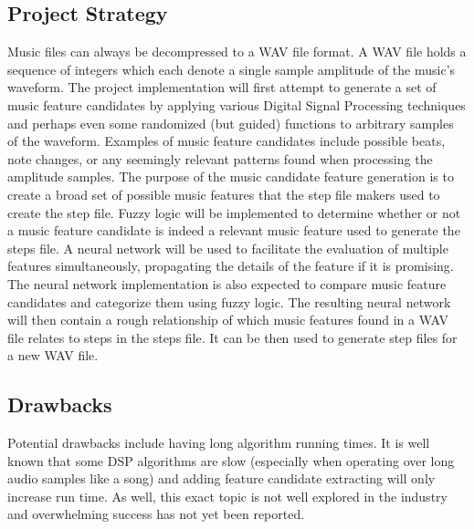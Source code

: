\subsection{Project Strategy}
Music files can always be decompressed to a WAV file format. A WAV file holds a sequence of
integers which each denote a single sample amplitude of the music’s waveform. The project
implementation will first attempt to generate a set of music feature candidates by applying 
various Digital Signal Processing techniques and perhaps even some randomized (but guided)
functions to arbitrary samples of the waveform. Examples of music feature candidates include
possible beats, note changes, or any seemingly relevant patterns found when processing the
amplitude samples. The purpose of the music candidate feature generation is to create a broad set
of possible music features that the step file makers used to create the step file. Fuzzy logic will
be implemented to determine whether or not a music feature candidate is indeed a relevant music
feature used to generate the steps file. A neural network will be used to facilitate the evaluation
of multiple features simultaneously, propagating the details of the feature if it is promising. The
neural network implementation is also expected to compare music feature candidates and
categorize them using fuzzy logic. The resulting neural network will then contain a rough
relationship of which music features found in a WAV file relates to steps in the steps file. It can
be then used to generate step files for a new WAV file.

\subsection{Drawbacks}

Potential drawbacks include having long algorithm running times. It is well known that some
DSP algorithms are slow (especially when operating over long audio samples like a song) and
adding feature candidate extracting will only increase run time. As well, this exact topic is not
well explored in the industry and overwhelming success has not yet been reported.